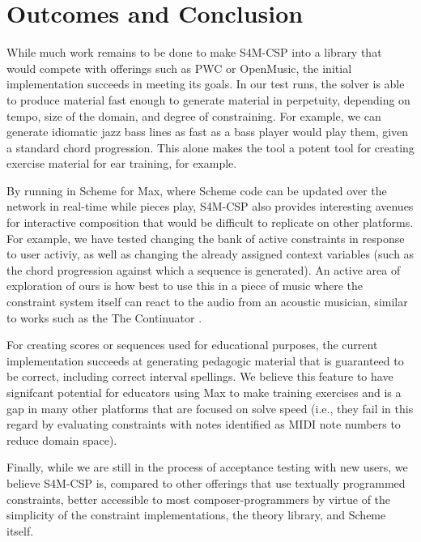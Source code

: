 \documentclass[pmlr]{jmlr}%
\begin{document}
\section{Outcomes and Conclusion}
While much work remains to be done to make S4M-CSP into a library that would compete
with offerings such as PWC or OpenMusic, the initial implementation succeeds in 
meeting its goals. In our test runs, the solver is able to produce material fast enough to generate 
material in perpetuity, depending on tempo, size of the domain, and degree of constraining.
For example, we can generate idiomatic jazz bass lines as fast as a bass player
would play them, given a standard chord progression. This alone makes the tool
a potent tool for creating exercise material for ear training, for example.

By running in Scheme for Max, where Scheme code can be updated over the network
in real-time while pieces play, S4M-CSP also provides interesting avenues
for interactive composition that would be difficult to replicate on other platforms.
For example, we have tested changing the bank of active constraints in response
to user activiy, as well as changing the already assigned context variables 
(such as the chord progression against which a sequence is generated).
An active area of exploration of ours is how best to use this in a piece
of music where the constraint system itself can react to the audio from an
acoustic musician, similar to works such as the The Continuator \citep{pachet2003continuator}.

For creating scores or sequences used for educational purposes, the current implementation
succeeds at generating pedagogic material that is guaranteed to be correct,
including correct interval spellings. We believe this feature to have signifcant
potential for educators using Max to make training exercises and is a gap
in many other platforms that are focused on solve speed (i.e., they fail
in this regard by evaluating constraints with notes identified as 
MIDI note numbers to reduce domain space).

Finally, while we are still in the process of acceptance testing with new users,
we believe S4M-CSP is, compared to other offerings that use textually programmed 
constraints, better accessible to most composer-programmers by virtue of the simplicity
of the constraint implementations, the theory library, and Scheme itself.



\end{document}
